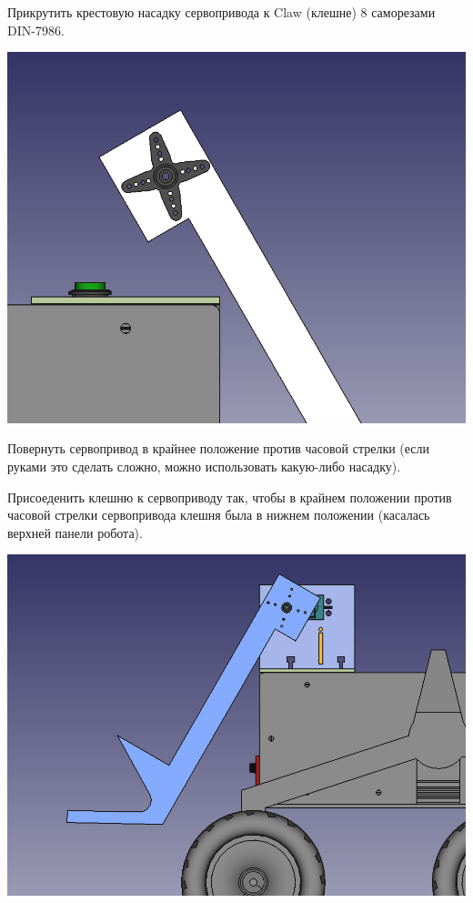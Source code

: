 \documentclass[12pt,a4paper,oneside]{article}
\begin{document}
Прикрутить крестовую насадку сервопривода к Claw (клешне) 8 саморезами DIN-7986.

\includegraphics[width=\textwidth]{servo}

Повернуть сервопривод в крайнее положение против часовой стрелки (если руками
это сделать сложно, можно использовать какую-либо насадку).

Присоеденить клешню к сервоприводу так, чтобы в крайнем положении против часовой
стрелки сервопривода клешня была в нижнем положении (касалась верхней панели
робота).

\includegraphics[width=\textwidth]{full_claw}
\end{document}
